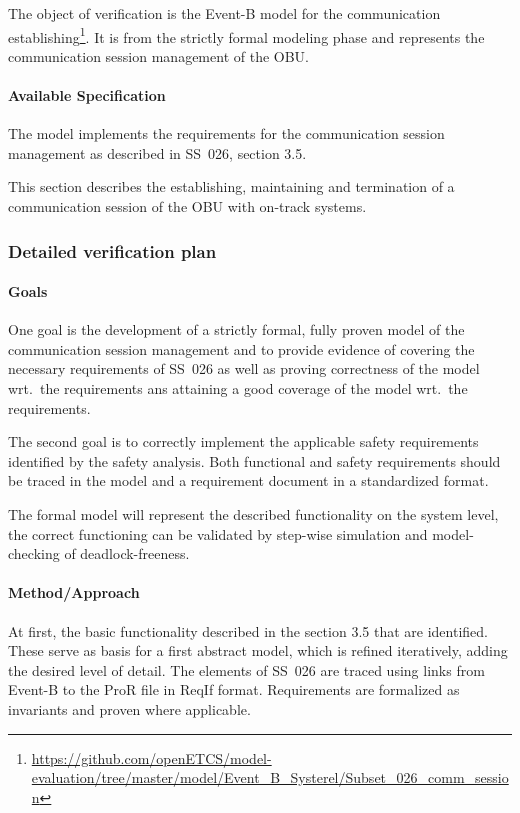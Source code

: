 The object of verification is the Event-B model for the communication
establishing\footnote{\url{https://github.com/openETCS/model-evaluation/tree/master/model/Event_B_Systerel/Subset_026_comm_session}}. It
is from the strictly formal modeling phase and represents the communication
session management of the OBU\@.

\paragraph{Available Specification}
\label{sec:avail-spec}

The model implements the requirements for the communication session management
as described in SS~026, section 3.5\cite{subset-26}.

This section describes the establishing, maintaining and termination of a
communication session of the OBU with on-track systems.

\subsubsection{Detailed verification plan}
\label{sec:deta-verif-plan}

\paragraph{Goals}

One goal is the development of a strictly formal, fully proven model of the
communication session management and to provide evidence of covering the
necessary requirements of SS~026 as well as proving correctness of the model
wrt.\ the requirements ans attaining a good coverage of the model wrt.\ the
requirements.

The second goal is to correctly implement the applicable safety requirements
identified by the safety analysis. Both functional and safety requirements
should be traced in the model and a requirement document in a standardized
format.

The formal model will represent the described functionality on the system level,
the correct functioning can be validated by step-wise simulation and
model-checking of deadlock-freeness.


\paragraph{Method/Approach}
\label{sec:methodapproach}

At first, the basic functionality described in the section 3.5 that are
identified. These serve as basis for a first abstract model, which is refined
iteratively, adding the desired level of detail. The elements of SS~026 are
traced using links from Event-B to the ProR file in ReqIf format. Requirements
are formalized as invariants and proven where applicable.

